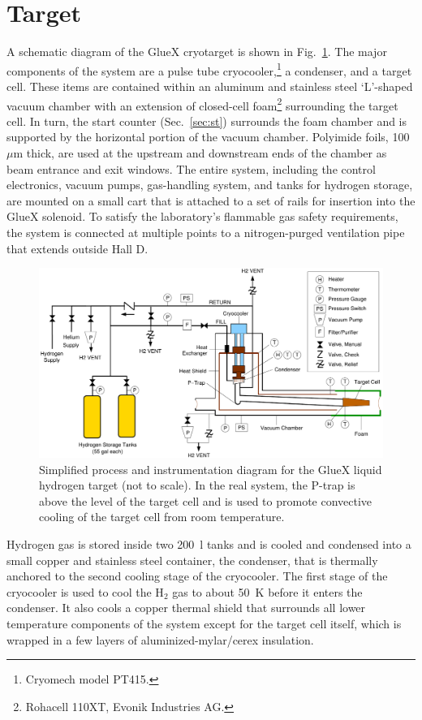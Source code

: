 \section[Target]{Target \label{sec:target} }
A schematic diagram of the GlueX cryotarget is shown in Fig.~\ref{fig:Target}. The major components of the system are a pulse tube cryocooler,\footnote{Cryomech model PT415.} a condenser, and a target cell.  These items are contained within an aluminum and stainless steel `L'-shaped vacuum chamber with an extension of closed-cell foam\footnote{Rohacell 110XT, Evonik Industries AG.} surrounding the target cell. In turn, the \gx{} start counter (Sec.~\ref{sec:st}) surrounds the foam chamber and is supported by the horizontal portion of the vacuum chamber. Polyimide foils, 100$\mu$m thick, are used at the upstream and downstream ends of the chamber as beam entrance and exit windows. The entire system, including the control electronics, vacuum pumps, gas-handling system, and tanks for hydrogen storage, are mounted on a small cart that is attached to a set of rails for insertion into the GlueX solenoid.  To satisfy the laboratory's flammable gas safety requirements, the system is connected at multiple points to a nitrogen-purged ventilation pipe that extends outside Hall D.
\begin{figure}
\begin{center}
\includegraphics[width=4.5in]{figures/TargetSchematic2.pdf}
\end{center}
\caption{Simplified process and instrumentation diagram for the GlueX liquid hydrogen target (not to scale).
In the real system, the P-trap is above the level of the target cell and is used to
promote convective cooling of the target cell from room temperature.}
\label{fig:Target}
\end{figure}

Hydrogen gas is stored inside two 200~l tanks and
is cooled and condensed into a small copper and stainless steel container,
the condenser, that is thermally anchored to the second cooling stage of the cryocooler. 
The first stage of the cryocooler is used to
cool the H$_2$ gas to about 50~K before it enters the condenser.
It also cools a copper thermal shield that surrounds all
lower temperature components of the system except for the
target cell itself, which is wrapped in a few layers of aluminized-mylar/cerex insulation.

